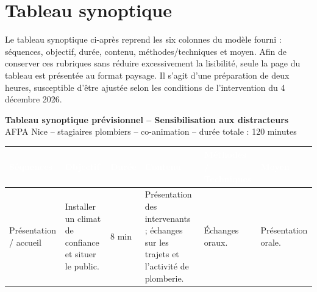 \section{Tableau synoptique}

Le tableau synoptique ci-après reprend les six colonnes du modèle fourni : séquences, objectif, durée, contenu, méthodes/techniques et moyen. Afin de conserver ces rubriques sans réduire excessivement la lisibilité, seule la page du tableau est présentée au format paysage. Il s’agit d’une préparation de deux heures, susceptible d’être ajustée selon les conditions de l’intervention du 4 décembre 2026.

\clearpage
{}

\begin{landscape}
\thispagestyle{plain}

\begin{center}
{\Large\bfseries Tableau synoptique prévisionnel -- Sensibilisation aux distracteurs}\\[2pt]

{\small
AFPA Nice -- stagiaires plombiers -- co-animation --
durée totale : 120 minutes}
\end{center}

\vspace{1mm}

\begingroup
\scriptsize

\setlength{\arrayrulewidth}{0.4pt}
\setlength{\tabcolsep}{5pt}
\renewcommand{\arraystretch}{1.18}

\begin{center}

\begin{tabular}{@{} L{3.2cm}
!{\color{gray!35}\vrule width 0.5pt}
L{4.4cm}
!{\color{gray!35}\vrule width 0.5pt}
C{1.5cm}
!{\color{gray!35}\vrule width 0.5pt}
L{6.8cm}
!{\color{gray!35}\vrule width 0.5pt}
L{4.6cm}
!{\color{gray!35}\vrule width 0.5pt}
L{4.3cm}
@{}
}

\toprule

\textcolor{white}{\textbf{Séquences}} &
\textcolor{white}{\textbf{Objectif}} &
\textcolor{white}{\textbf{Durée}} &
\textcolor{white}{\textbf{Contenu}} &
\textcolor{white}{\textbf{Méthodes / Techniques}} &
\textcolor{white}{\textbf{Moyen}} \\
\midrule

Présentation / accueil &
Installer un climat de confiance et situer le public. &
8 min &
Présentation des intervenants ; échanges sur les trajets et l'activité de plomberie. &
Échanges oraux. &
Présentation orale. \\
\midrule


\end{tabular}
\end{center}
\end{landscape}
